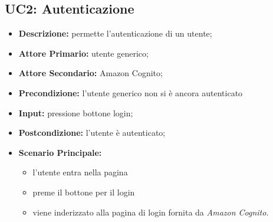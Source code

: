 \subsection{UC2: Autenticazione}
    \label{sec:UC2}
    \begin{itemize}
        \item \textbf{Descrizione:} permette l'autenticazione di un utente;
        \item \textbf{Attore Primario:} utente generico;
        \item \textbf{Attore Secondario:} Amazon Cognito;
        \item \textbf{Precondizione:} l'utente generico non si è ancora autenticato
        \item \textbf{Input:} pressione bottone login;
        \item \textbf{Postcondizione:} l'utente è autenticato;
        \item \textbf{Scenario Principale:} 
        \begin{itemize}
            \item l'utente entra nella pagina
            \item preme il bottone per il login
            \item viene inderizzato alla pagina di login fornita da \textit{Amazon Cognito}.
        \end{itemize}
    \end{itemize}